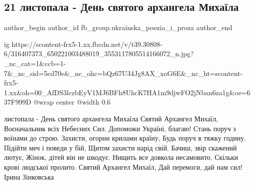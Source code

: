  
 
 
 
 
 
\subsection{21 листопала - День святого архангела Михаїла}
\label{sec:21_11_2022.fb.fb_group.ukrainska_poezia_i_proza.1.arhangel_mihail}
 
\ifcmt
 author_begin
   author_id fb_group.ukrainska_poezia_i_proza
 author_end
\fi

\ifcmt
  ig https://scontent-frx5-1.xx.fbcdn.net/v/t39.30808-6/316407373_650221003488019_3553117805514166072_n.jpg?_nc_cat=1&ccb=1-7&_nc_sid=5cd70e&_nc_ohc=bQz67U34Jg8AX_xoG6E&_nc_ht=scontent-frx5-1.xx&oh=00_AfDS3lczbEyV1MJ6BFh8UhcK7HA1m9djwFO2jNban6za1g&oe=637F999D
  @wrap center
  @width 0.6
\fi

\obeycr
{} листопала - День святого архангела Михаїла
\smallskip
Святий Архангел Михаїл,
Воєначальник всіх Небесних Сил.
Допоможи Україні, благаю!
Стань поруч з воїнами до строю.
Захисти, огорни крилами країну,
Будь поруч в тяжку годину.
Підійти меч і поведи у бій,
Щитом захисти нарід свій.
Бачиш, звір скажений лютує,
Жінок, дітей він не шкодує.
Нищить все довкола несамовито,
Скільки крові людської пролито.
Святий Архангел Михаїл,
Дай перемоги, дай нам сил! 
\smallskip
Ірина Зінковська
\restorecr

